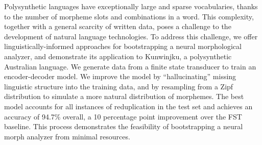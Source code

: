 Polysynthetic languages have exceptionally large and sparse vocabularies, thanks to the number of morpheme slots and combinations in a word. This complexity, together with a general scarcity of written data, poses a challenge to the development of natural language technologies. To address this challenge, we offer linguistically-informed approaches for bootstrapping a neural morphological analyzer, and demonstrate its application to Kunwinjku, a polysynthetic Australian language. We generate data from a finite state transducer to train an encoder-decoder model. We improve the model by ``hallucinating'' missing linguistic structure into the training data, and by resampling from a Zipf distribution to simulate a more natural distribution of morphemes. The best model accounts for all instances of reduplication in the test set and achieves an accuracy of 94.7\% overall, a 10 percentage point improvement over the FST baseline. This process demonstrates the feasibility of bootstrapping a neural morph analyzer from minimal resources.
